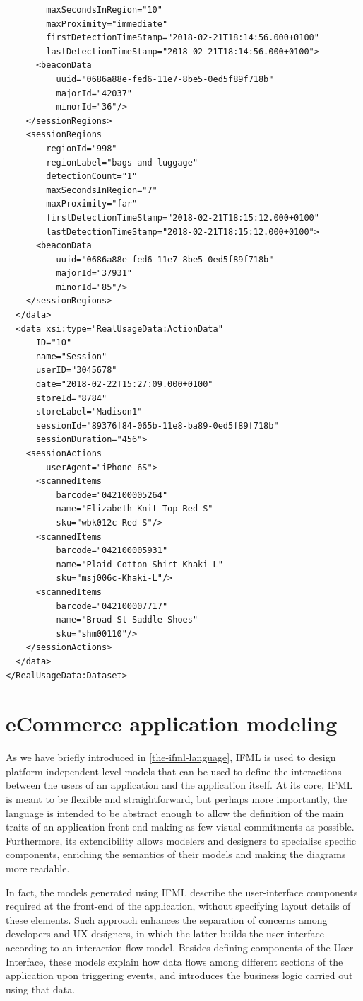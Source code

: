 \begin{lstlisting}
        maxSecondsInRegion="10"
        maxProximity="immediate"
        firstDetectionTimeStamp="2018-02-21T18:14:56.000+0100"
        lastDetectionTimeStamp="2018-02-21T18:14:56.000+0100">
      <beaconData
          uuid="0686a88e-fed6-11e7-8be5-0ed5f89f718b"
          majorId="42037"
          minorId="36"/>
    </sessionRegions>
    <sessionRegions
        regionId="998"
        regionLabel="bags-and-luggage"
        detectionCount="1"
        maxSecondsInRegion="7"
        maxProximity="far"
        firstDetectionTimeStamp="2018-02-21T18:15:12.000+0100"
        lastDetectionTimeStamp="2018-02-21T18:15:12.000+0100">
      <beaconData
          uuid="0686a88e-fed6-11e7-8be5-0ed5f89f718b"
          majorId="37931"
          minorId="85"/>
    </sessionRegions>
  </data>
  <data xsi:type="RealUsageData:ActionData"
      ID="10"
      name="Session"
      userID="3045678"
      date="2018-02-22T15:27:09.000+0100"
      storeId="8784"
      storeLabel="Madison1"
      sessionId="89376f84-065b-11e8-ba89-0ed5f89f718b"
      sessionDuration="456">
    <sessionActions
        userAgent="iPhone 6S">
      <scannedItems
          barcode="042100005264"
          name="Elizabeth Knit Top-Red-S"
          sku="wbk012c-Red-S"/>
      <scannedItems
          barcode="042100005931"
          name="Plaid Cotton Shirt-Khaki-L"
          sku="msj006c-Khaki-L"/>
      <scannedItems
          barcode="042100007717"
          name="Broad St Saddle Shoes"
          sku="shm00110"/>
    </sessionActions>
  </data>
</RealUsageData:Dataset>
\end{lstlisting}
\vspace{0.5cm}
\section{eCommerce application modeling}

As we have briefly introduced in \ref{the-ifml-language}, IFML is used to design platform independent-level models that can be used to define the interactions between the users of an application and the application itself. At its core, IFML is meant to be flexible and straightforward, but perhaps more importantly, the language is intended to be abstract enough to allow the definition of the main traits of an application front-end making as few visual commitments as possible. Furthermore, its extendibility  allows modelers and designers to specialise specific components, enriching the semantics of their models and making the diagrams more readable.

In fact, the models generated using IFML describe the user-interface components required at the front-end of the application, without specifying layout details of these elements. Such approach enhances the separation of concerns among developers and UX designers, in which the latter builds the user interface according to an interaction flow model. Besides defining components of the User Interface, these models explain how data flows among different sections of the application upon triggering events, and introduces the business logic carried out using that data.

